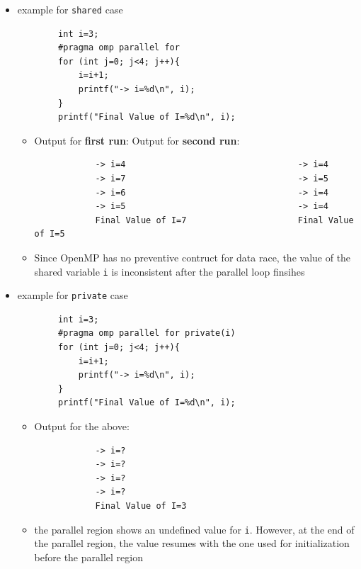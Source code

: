 \documentclass[12pt, a4paper]{report}
\begin{document}
\begin{itemize}
    \item example for \verb$shared$ case
    \begin{verbatim}
        int i=3;
        #pragma omp parallel for
        for (int j=0; j<4; j++){
            i=i+1;
            printf("-> i=%d\n", i); 
        }
        printf("Final Value of I=%d\n", i);
    \end{verbatim}
    \begin{itemize}
        \item Output for {\bfseries{first run}}: \qquad\qquad\qquad\qquad\qquad\textendash\hspace{0.2em} Output for {\bfseries{second run}}:
        \begin{verbatim}
            -> i=4                                  -> i=4
            -> i=7                                  -> i=5
            -> i=6                                  -> i=4
            -> i=5                                  -> i=4
            Final Value of I=7                      Final Value of I=5
        \end{verbatim}
        \item Since OpenMP has no preventive contruct for data race, the value of the shared variable \verb$i$ is inconsistent after the parallel
              loop finsihes 
    \end{itemize}
    \item example for \verb$private$ case
    \begin{verbatim}
        int i=3;
        #pragma omp parallel for private(i)
        for (int j=0; j<4; j++){
            i=i+1;
            printf("-> i=%d\n", i); 
        }
        printf("Final Value of I=%d\n", i);
    \end{verbatim}
    \begin{itemize}
        \item Output for the above: 
        \begin{verbatim}
            -> i=?
            -> i=?
            -> i=?
            -> i=?
            Final Value of I=3
        \end{verbatim}
        \item the parallel region shows an undefined value for \verb$i$. However, at the end of the parallel region, the value resumes with
              the one used for initialization before the parallel region 
    \end{itemize}
\end{itemize}
\end{document}
